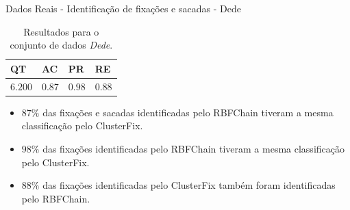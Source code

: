 \documentclass[10pt]{beamer}
\begin{document}
\begin{frame}{Dados Reais - Identificação de fixações e sacadas -  Dede}
    \begin{table}[ht!]
        \centering
        \caption{Resultados para o conjunto de dados \textit{Dede}.}
        \label{tbl:dede}
        \begin{tabular}{llll}

        \toprule
        QT              & AC                     & PR                     & RE         \\
        \midrule
        $6.200$         & $0.87$                 & $0.98$                 & $0.88$      \\
        \bottomrule

        \end{tabular}
    \end{table}

    \begin{itemize}
        \item \alert{$87\%$} das fixações e sacadas identificadas pelo RBFChain tiveram a mesma classificação pelo ClusterFix.
        \item \alert{$98\%$} das fixações identificadas pelo RBFChain tiveram a mesma classificação pelo ClusterFix.
        \item \alert{$88\%$} das fixações identificadas pelo ClusterFix também foram identificadas pelo RBFChain.
    \end{itemize}
\end{frame}
\end{document}
